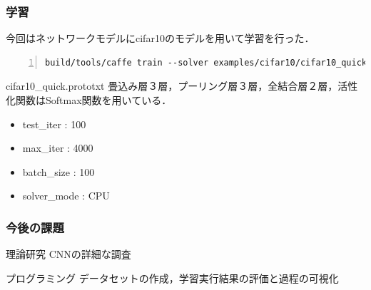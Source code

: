 \documentclass[dvipdfmx,11pt,notheorems]{beamer}
\theoremstyle{definition}
\begin{document}
\begin{frame}[fragile]\frametitle{学習}
 今回はネットワークモデルにcifar10のモデルを用いて学習を行った．
\begin{lstlisting}[basicstyle=\ttfamily\footnotesize, frame=single, tabsize=2,showtabs,firstnumber=1, numbers=left, breaklines=true]
build/tools/caffe train --solver examples/cifar10/cifar10_quick_solver.prototxt
\end{lstlisting}
\begin{exampleblock}{cifar10\_quick.prototxt}
 畳込み層３層，プーリング層３層，全結合層２層，活性化関数はSoftmax関数を用いている．
\end{exampleblock}
\begin{itemize}
 \item test\_iter : 100
 \item max\_iter : 4000
 \item batch\_size : 100
 \item solver\_mode : CPU
\end{itemize}
\end{frame}


\begin{frame}\frametitle{今後の課題}

\begin{block}{理論研究}
CNNの詳細な調査
\end{block}

\vspace{1cm}
\begin{exampleblock}{プログラミング}
データセットの作成，学習実行結果の評価と過程の可視化
\end{exampleblock}
\end{frame}

\end{document}
